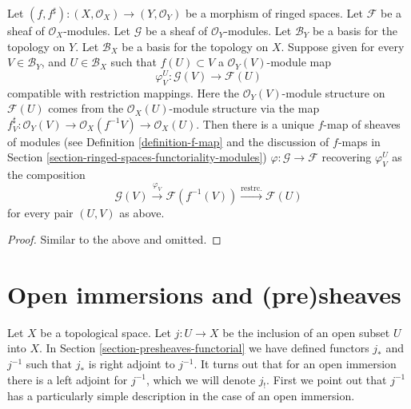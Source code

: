 \begin{lemma}
\label{lemma-f-map-basis-above-and-below-modules}
Let $(f, f^\sharp) : (X, \mathcal{O}_X) \to (Y, \mathcal{O}_Y)$
be a morphism of ringed spaces.
Let $\mathcal{F}$ be a sheaf of $\mathcal{O}_X$-modules.
Let $\mathcal{G}$ be a sheaf of $\mathcal{O}_Y$-modules.
Let $\mathcal{B}_Y$ be a basis for the topology on $Y$.
Let $\mathcal{B}_X$ be a basis for the topology on $X$.
Suppose given for every $V \in \mathcal{B}_Y$, and
$U \in \mathcal{B}_X$ such that $f(U) \subset V$ a
$\mathcal{O}_Y(V)$-module map
$$
\varphi_V^U :
\mathcal{G}(V)
\longrightarrow
\mathcal{F}(U)
$$
compatible with restriction mappings. Here the
$\mathcal{O}_Y(V)$-module structure on $\mathcal{F}(U)$
comes from the $\mathcal{O}_X(U)$-module structure
via the map $f^\sharp_V : \mathcal{O}_Y(V)
\to \mathcal{O}_X(f^{-1}V) \to \mathcal{O}_X(U)$.
Then there is a unique $f$-map of sheaves of modules (see
Definition \ref{definition-f-map} and the discussion
of $f$-maps in Section \ref{section-ringed-spaces-functoriality-modules})
$\varphi : \mathcal{G} \to \mathcal{F}$
recovering $\varphi_V^U$ as the composition
$$
\mathcal{G}(V) \xrightarrow{\varphi_V}
\mathcal{F}(f^{-1}(V)) \xrightarrow{\text{restrc.}}
\mathcal{F}(U)
$$
for every pair $(U, V)$ as above.
\end{lemma}

\begin{proof}
Similar to the above and omitted.
\end{proof}

\section{Open immersions and (pre)sheaves}
\label{section-open-immersions}

\noindent
Let $X$ be a topological space.
Let $j : U \to X$ be the inclusion of an open subset $U$ into $X$.
In Section \ref{section-presheaves-functorial} we have defined
functors $j_*$ and $j^{-1}$ such that $j_*$ is right adjoint to
$j^{-1}$. It turns out that for an open immersion there is a left adjoint
for $j^{-1}$, which we will denote $j_!$. First we point out that
$j^{-1}$ has a particularly simple description in the case of
an open immersion.

